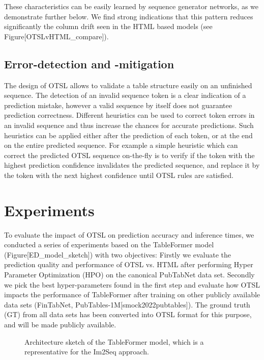 \documentclass[11pt,a4paper]{article}
\begin{document}
These characteristics can be easily learned by sequence generator networks, as we demonstrate further below. We find strong indications that this pattern reduces significantly the column drift seen in the HTML based models (see Figure[OTSLvHTML\_compare]).

\subsection{Error-detection and -mitigation}

The design of OTSL allows to validate a table structure easily on an unfinished sequence. The detection of an invalid sequence token is a clear indication of a prediction mistake, however a valid sequence by itself does not guarantee prediction correctness. Different heuristics can be used to correct token errors in an invalid sequence and thus increase the chances for accurate predictions. Such heuristics can be applied either after the prediction of each token, or at the end on the entire predicted sequence. For example a simple heuristic which can correct the predicted OTSL sequence on-the-fly is to verify if the token with the highest prediction confidence invalidates the predicted sequence, and replace it by the token with the next highest confidence until OTSL rules are satisfied.

\section{Experiments}

To evaluate the impact of OTSL on prediction accuracy and inference times, we conducted a series of experiments based on the TableFormer model (Figure[ED\_model\_sketch]) with two objectives: Firstly we evaluate the prediction quality and performance of OTSL vs. HTML after performing Hyper Parameter Optimization (HPO) on the canonical PubTabNet data set. Secondly we pick the best hyper-parameters found in the first step and evaluate how OTSL impacts the performance of TableFormer after training on other publicly available data sets (FinTabNet, PubTables-1M[smock2022pubtables]). The ground truth (GT) from all data sets has been converted into OTSL format for this purpose, and will be made publicly available.

\begin{figure}[h]
\caption{Architecture sketch of the TableFormer model, which is a representative for the Im2Seq approach.}
\end{figure}
\end{document}
